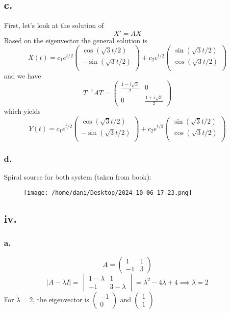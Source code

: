 \documentclass[11pt]{article}
\theoremstyle{mystyle}
\theoremstyle{definition}
\begin{document}
\subsection*{c.}
First, let's look at the solution of 
\[
  X' = AX
\]
Based on the eigenvector the general solution is 
\[
  X(t) = c_1 e^{t/2} 
  \begin{pmatrix}
    \cos (\sqrt{3}t/2) \\
    - \sin (\sqrt{3}t/2) \\
  \end{pmatrix}
  + c_2 e^{t/2}
  \begin{pmatrix}
    \sin (\sqrt{3}t/2) \\
    \cos (\sqrt{3}t/2) \\
  \end{pmatrix}
\]
and we have 
\[
  T^{-1} A T = 
  \begin{pmatrix}
    \frac{1-i\sqrt{3}}{2} & 0 \\
    0 & \frac{1+i\sqrt{3}}{2} 
  \end{pmatrix}
\]
which yields 
\[
  Y(t) = c_1 e^{t/2} 
  \begin{pmatrix}
    \cos (\sqrt{3}t/2) \\
    - \sin (\sqrt{3}t/2) \\
  \end{pmatrix}
  + c_2 e^{t/2}
  \begin{pmatrix}
    \sin (\sqrt{3}t/2) \\
    \cos (\sqrt{3}t/2) \\
  \end{pmatrix}
\]
\subsubsection*{d.}
Spiral source for both system (taken from book):
\begin{figure}[h]
  \centering
  \texttt{[image: /home/dani/Desktop/2024-10-06\_17-23.png]}
  \caption{}
  \label{fig:2024-10-06_17-23}
\end{figure}
\subsection*{iv.}
\subsubsection*{a.}
\[
  A = 
  \begin{pmatrix}
    1 & 1 \\
    -1 & 3
  \end{pmatrix}
\]
\[
  |A-\lambda I |= 
  \begin{vmatrix}
    1 - \lambda & 1 \\
    -1 & 3-\lambda
  \end{vmatrix}
  = \lambda^2 - 4\lambda + 4 
  \implies \lambda = 2
\]
For $\lambda = 2$, the eigenvector is 
$\begin{pmatrix}
  -1 \\
  0
\end{pmatrix}
$
and 
$ 
\begin{pmatrix}
  1 \\
  1
\end{pmatrix}
$
\end{document}
